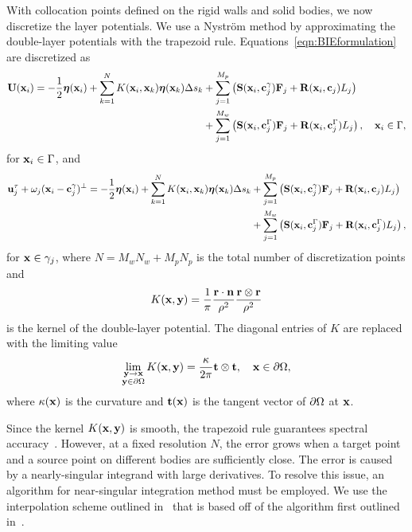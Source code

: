 \documentclass[AMA,STIX1COL]{WileyNJD-v2}
\begin{document}
With collocation points defined on the rigid walls and solid bodies, we
now discretize the layer potentials.  We use a Nystr\"om method by
approximating the double-layer potentials with the trapezoid rule.
Equations~\eqref{eqn:BIEformulation} are discretized as
\begin{equation*}
  \begin{aligned}
  {\mathbf{U}}({\mathbf{x}}_i) = -\frac{1}{2}{\boldsymbol\eta}({\mathbf{x}}_i) + 
  \sum_{k=1}^{N} K({\mathbf{x}}_i,{\mathbf{x}}_k) {\boldsymbol\eta}({\mathbf{x}}_k) \Delta s_k
    &+ \sum_{j=1}^{M_p} \left(\mathbf{S}({\mathbf{x}}_i,{\mathbf{c}}^\gamma_j){\mathbf{F}}_j +
    \mathbf{R}({\mathbf{x}}_i,{\mathbf{c}}_j)L_j\right)  \\
    &+ \sum_{j=1}^{M_w} \left(\mathbf{S}({\mathbf{x}}_i,{\mathbf{c}}^\Gamma_j){\mathbf{F}}_j +
    \mathbf{R}({\mathbf{x}}_i,{\mathbf{c}}^\Gamma_j)L_j\right), \quad {\mathbf{x}}_i \in \Gamma,
  \end{aligned}
\end{equation*}
for ${\mathbf{x}}_i \in \Gamma$, and
\begin{equation*}
  \begin{aligned}
{\mathbf{u}}^\tau_j + \omega_j({\mathbf{x}}_i - {\mathbf{c}}^\gamma_j)^\perp =
-\frac{1}{2}{\boldsymbol\eta}({\mathbf{x}}_i) +
\sum_{k=1}^{N} K({\mathbf{x}}_i,{\mathbf{x}}_k) {\boldsymbol\eta}({\mathbf{x}}_k) \Delta s_k
    &+ \sum_{j=1}^{M_p} \left(\mathbf{S}({\mathbf{x}}_i,{\mathbf{c}}^\gamma_j){\mathbf{F}}_j +
    \mathbf{R}({\mathbf{x}}_i,{\mathbf{c}}_j)L_j\right) \\
    &+ \sum_{j=1}^{M_w} \left(\mathbf{S}({\mathbf{x}}_i,{\mathbf{c}}^\Gamma_j){\mathbf{F}}_j +
    \mathbf{R}({\mathbf{x}}_i,{\mathbf{c}}^\Gamma_j)L_j\right),
  \end{aligned}
\end{equation*}
for ${\mathbf{x}} \in \gamma_j$, where $N = M_w N_w + M_p N_p$ is the total
number of discretization points and
\begin{align*}
  K({\mathbf{x}},{\mathbf{y}}) = \frac{1}{\pi} \frac{{\mathbf{r}} \cdot {\mathbf{n}}}{\rho^2} 
               \frac{{\mathbf{r}} \otimes {\mathbf{r}}}{\rho^2}
\end{align*}
is the kernel of the double-layer potential.  The diagonal entries of
$K$ are replaced with the limiting value
\begin{align*}
  \lim_{\substack{{\mathbf{y}} \rightarrow {\mathbf{x}} \\ {\mathbf{y}} \in {\partial}\Omega}} 
    K({\mathbf{x}},{\mathbf{y}}) = \frac{\kappa}{2\pi}{\mathbf{t}}\otimes{\mathbf{t}},
    \quad {\mathbf{x}} \in {\partial}\Omega,
\end{align*}
where $\kappa({\mathbf{x}})$ is the curvature and ${\mathbf{t}}({\mathbf{x}})$ is the tangent
vector of ${\partial}\Omega$ at ${\mathbf{x}}$.

Since the kernel $K({\mathbf{x}},{\mathbf{y}})$ is smooth, the trapezoid rule guarantees
spectral accuracy~\cite{Trefethan2014}.  However, at a fixed resolution
$N$, the error grows when a target point and a source point on different
bodies are sufficiently close.  The error is caused by a nearly-singular
integrand with large derivatives.  To resolve this issue, an algorithm
for near-singular integration method must be employed.  We use the
interpolation scheme outlined in~\cite{Quaife2014} that is based off of
the algorithm first outlined in~\cite{Ying2006}.
  
\end{document}
